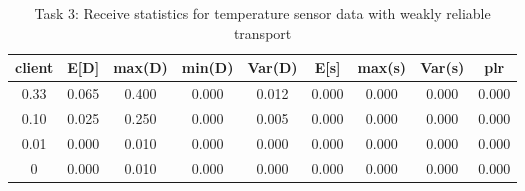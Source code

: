 \begin{table}
\centering
\begin{tabular}{|c|c|c|c|c|c|c|c|c|}
\hline
client & E[D] & max(D) & min(D) & Var(D) & E[s] & max(s) & Var(s) & plr\\
\hline
0.33 & 0.065 & 0.400 & 0.000 & 0.012 & 0.000 & 0.000 & 0.000 & 0.000 \\
\hline
0.10 & 0.025 & 0.250 & 0.000 & 0.005 & 0.000 & 0.000 & 0.000 & 0.000 \\
\hline
0.01 & 0.000 & 0.010 & 0.000 & 0.000 & 0.000 & 0.000 & 0.000 & 0.000 \\
\hline
0 & 0.000 & 0.010 & 0.000 & 0.000 & 0.000 & 0.000 & 0.000 & 0.000 \\
\hline
\end{tabular}
\caption{Task 3: Receive statistics for temperature sensor data with weakly reliable transport}
\label{table:task3-temp-b}
\end{table}


